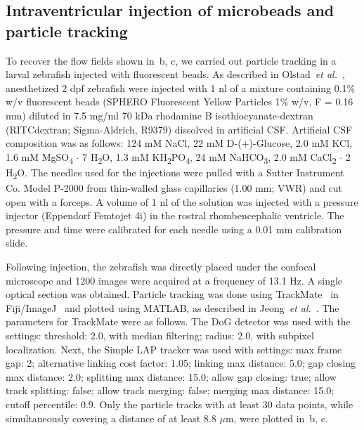 \documentclass[fleqn]{wlscirep}
\begin{document}
\subsection*{Intraventricular injection of microbeads and particle tracking}
To recover the flow fields shown in~b, c, we carried out particle tracking in a larval zebrafish injected with fluorescent beads.
As described in Olstad~\emph{et al.}~\cite{Olstad2019CiliaryDevelopment}, anesthetized 2 dpf zebrafish were injected with 1 nl of a mixture containing 0.1\% w/v fluorescent beads
(SPHERO Fluorescent Yellow Particles 1\% w/v, F = 0.16 mm) diluted in 7.5 mg/ml 70 kDa rhodamine B isothiocyanate-dextran (RITCdextran; Sigma-Aldrich, R9379)
dissolved in artificial CSF. Artificial CSF composition was as follows: 124 mM NaCl, 22 mM D-(+)-Glucose, 2.0 mM KCl, 1.6 mM MgSO\textsubscript{4} $\cdot$ 7 H\textsubscript{2}O,
1.3 mM KH\textsubscript{2}PO\textsubscript{4}, 24 mM NaHCO\textsubscript{3}, 2.0 mM CaCl\textsubscript{2} $\cdot$ 2 H\textsubscript{2}O.
The needles used for the injections were pulled with a Sutter Instrument Co. Model P-2000 from thin-walled glass capillaries (1.00 mm; VWR) and cut open with a forceps.
A volume of 1 nl of the solution was injected with a pressure injector (Eppendorf Femtojet 4i) in the rostral rhombencephalic ventricle.
The pressure and time were calibrated for each needle using a 0.01 mm calibration slide.

Following injection, the zebrafish was directly placed under the confocal microscope and 1200 images were acquired at a frequency of 13.1 Hz.
A single optical section was obtained. Particle tracking was done using TrackMate~\cite{Tinevez2017TrackMate:Tracking} in Fiji/ImageJ~\cite{Schindelin2012Fiji:Analysis}
and plotted using MATLAB, as described in Jeong~\emph{et al.}~\cite{Jeong2022MeasurementTelencephalon}. The parameters for TrackMate were as follows.
The DoG detector was used with the settings: threshold: 2.0, with median filtering; radius: 2.0, with subpixel localization.
Next, the Simple LAP tracker was used with settings: max frame gap: 2; alternative linking cost factor: 1.05; linking max distance: 5.0; gap closing max distance: 2.0;
splitting max distance: 15.0; allow gap closing: true; allow track splitting: false; allow track merging: false; merging max distance: 15.0; cutoff percentile: 0.9.
Only the particle tracks with at least 30 data points, while simultaneously covering a distance of at least 8.8 $\mu$m, were plotted in~b, c.

\end{document}
